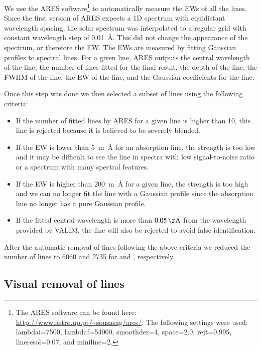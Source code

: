 \documentclass{aa}
\begin{document}
We use the ARES software\footnote{The ARES software can be found
here: \url{http://www.astro.up.pt/~sousasag/ares/}. The following
settings were used: lambdai=7500, lambdaf=54000, smoothder=4, space=2.0,
rejt=0.995, lineresol=0.07, and miniline=2.}\citep{Sousa2007,Sousa2015a}
to automatically measure the EWs of all the lines. Since the first
version of ARES expects a 1D spectrum with equidistant wavelength
spacing, the solar spectrum was interpolated to a regular grid with
constant wavelength step of \SI{0.01}{\angstrom}. This did not change
the appearance of the spectrum, or therefore the EW. The EWs are
measured by fitting Gaussian profiles to spectral lines. For a given
line, ARES outputs the central wavelength of the line, the number of
lines fitted for the final result, the depth of the line, the FWHM of
the line, the EW of the line, and the Gaussian coefficients for the
line.

Once this step was done we then selected a subset of lines using the
following criteria:
\begin{itemize}
    \item If the number of fitted lines by ARES for a given line is higher than 10,
        this line is rejected because it is believed to be severely blended.
    \item If the EW is lower than \SI{5}{m\angstrom} for an absorption line, the strength
        is too low and it may be difficult to see the line in spectra with low
        signal-to-noise ratio or a spectrum with many spectral features.
    \item If the EW is higher than \SI{200}{m\angstrom} for a given line, the strength
        is too high and we can no longer fit the line with a Gaussian profile since
        the absorption line no longer has a pure Gaussian profile.
    \item If the fitted central wavelength is more than $\SI{0.05}{\AA}$
        from the wavelength provided by VALD3, the line will also be rejected to
        avoid false identification.
\end{itemize}
After the automatic removal of lines following the above criteria
we reduced the number of lines to 6060 and 2735 for  and
, respectively.



\subsection{Visual removal of lines}
\label{sub:visual_removal_of_lines}
\end{document}
